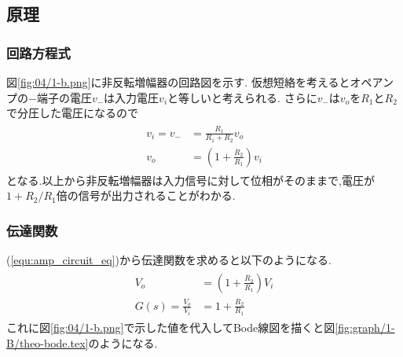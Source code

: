\subsection{原理}
\subsubsection{回路方程式}
図\ref{fig:04/1-b.png}に非反転増幅器の回路図を示す.
仮想短絡を考えるとオペアンプの$-$端子の電圧$v_{-}$は入力電圧$v_i$と等しいと考えられる.
さらに$v_-$は$v_o$を$R_1$と$R_2$で分圧した電圧になるので
\begin{align}
  \begin{split}
    \label{equ:amp_circuit_eq}
    v_i=v_-&=\frac{R_1}{R_1+R_2}v_o\\
    v_o&=\left(1+\frac{R_2}{R_1}\right)v_i
  \end{split}
\end{align}
となる.以上から非反転増幅器は入力信号に対して位相がそのままで,電圧が$1+R_2/R_1$倍の信号が出力されることがわかる.
\subsubsection{伝達関数}
(\ref{equ:amp_circuit_eq})から伝達関数を求めると以下のようになる.
\begin{align}
  \begin{split}
    V_o&=\left(1+\frac{R_2}{R_1}\right)V_i\\
    G(s)=\frac{V_o}{V_i}&=1+\frac{R_2}{R_1}
  \end{split}
\end{align}
これに図\ref{fig:04/1-b.png}で示した値を代入してBode線図を描くと図\ref{fig:graph/1-B/theo-bode.tex}のようになる.
